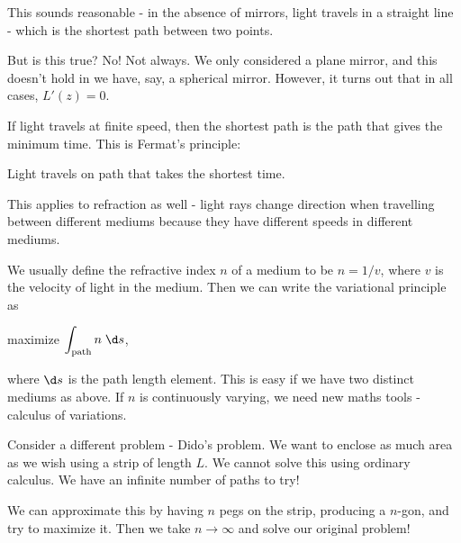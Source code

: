 \documentclass[a4paper]{article}
\begin{document}
This sounds reasonable - in the absence of mirrors, light travels in a straight line - which is the shortest path between two points.

But is this true? No! Not always. We only considered a plane mirror, and this doesn't hold in we have, say, a spherical mirror. However, it turns out that in all cases, $L'(z) = 0$.

If light travels at finite speed, then the shortest path is the path that gives the minimum time. This is Fermat's principle:
\begin{center}
  Light travels on path that takes the shortest time.
\end{center}
This applies to refraction as well - light rays change direction when travelling between different mediums because they have different speeds in different mediums.

We usually define the refractive index $n$ of a medium to be $n = 1/v$, where $v$ is the velocity of light in the medium. Then we can write the variational principle as
\begin{center}
  maximize $\displaystyle \int_{\text{path}} n\;\d s$,
\end{center}
where $\d s$ is the path length element. This is easy if we have two distinct mediums as above. If $n$ is continuously varying, we need new maths tools - calculus of variations. 

Consider a different problem - Dido's problem. We want to enclose as much area as we wish using a strip of length $L$. We cannot solve this using ordinary calculus. We have an infinite number of paths to try!

We can approximate this by having $n$ pegs on the strip, producing a $n$-gon, and try to maximize it. Then we take $n\to \infty$ and solve our original problem!
\end{document}
